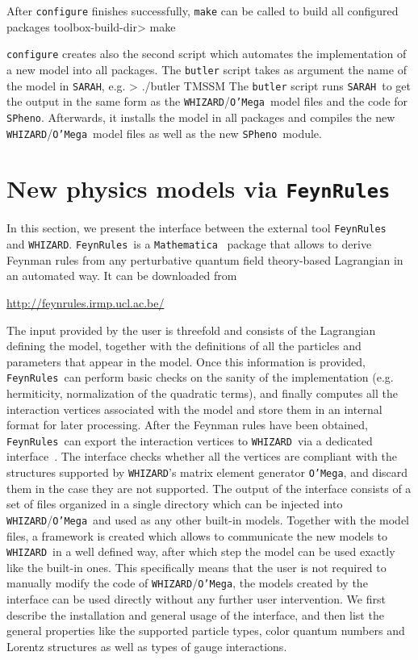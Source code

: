 \documentclass[12pt]{book}
\newenvironment{code}%
  {\begingroup\footnotesize
   \quote
   \Verbatim}%
  {\endVerbatim
   \endquote
   \endgroup\noindent}
\newcommand{\ttt}[1]{\texttt{#1}}
\newcommand{\whizard}{\ttt{WHIZARD}}
\newcommand{\oMega}{\ttt{O'Mega}}
\newcommand{\sarah}{\ttt{SARAH}}
\newcommand{\spheno}{\ttt{SPheno}}
\newcommand{\Mathematica}{\ttt{Mathematica}}
\newcommand{\FeynRules}{\ttt{FeynRules}}
\begin{document}
After \verb"configure" finishes successfully, \verb"make" can be called to build
all configured packages
%
\begin{code}
toolbox-build-dir> make
\end{code}

\verb"configure" creates also the second script which automates the implementation
of a new model into all packages. The \verb"butler" script takes as argument the
name of the model in \sarah, e.g.
\begin{code}
> ./butler TMSSM
\end{code}
The \verb"butler" script runs \sarah\ to get the output in the same
form as the \whizard/\oMega\
model files and the code for \spheno. Afterwards, it installs the
model in all packages and compiles the new \whizard/\oMega\ model
files as well as the new \spheno\ module.

\newpage

\section{New physics models via \FeynRules}

In this section, we present the interface between the external tool
\FeynRules\ \cite{Christensen:2008py,Christensen:2009jx,Duhr:2011se}
and \whizard. \FeynRules\ is a
\Mathematica~\cite{mathematica} package that allows to derive
Feynman rules from any perturbative quantum field theory-based Lagrangian
in an automated way. It can be downloaded from
\begin{center}
  \url{http://feynrules.irmp.ucl.ac.be/}
\end{center}
The input provided by the user is threefold and consists
of the Lagrangian defining the model, together with the definitions of
all the
particles and parameters that appear in the model.
Once this information is provided, \FeynRules\ can perform basic checks
on the sanity of the implementation (e.g. hermiticity, normalization
of the quadratic terms), and finally computes all the interaction
vertices associated  with the model and store them in an internal
format for later processing. After the Feynman rules have been
obtained, \FeynRules\ can export the interaction vertices to \whizard\
via a dedicated interface~\cite{Christensen:2010wz}. The interface
checks whether all the vertices are compliant with the structures
supported by \whizard's
matrix element generator \oMega, and discard them in the case
they are not supported. The output of the interface consists of a set
of files organized in a single directory which can be injected into
\whizard/\oMega\ and used as any other built-in models. Together with
the model files, a framework is created which allows to communicate
the new models to \whizard\ in a well defined way, after which
step the model can be used exactly like the built-in ones.
This specifically means that the user is not required to
manually modify the code of \whizard/\oMega, the models created by the
interface can be used directly without any further user intervention.
We first describe the installation and general usage of the interface,
and then list the general properties like the supported particle
types, color quantum numbers and Lorentz structures as well as types
of gauge interactions.
\end{document}
